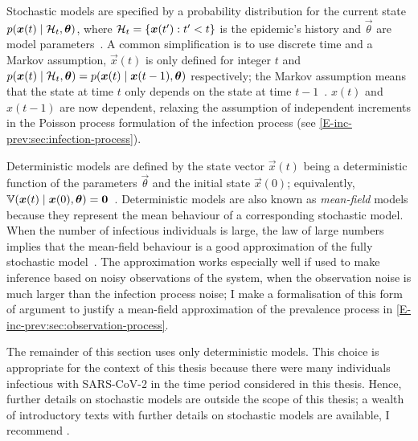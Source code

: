 \documentclass[thesis.tex]{subfiles}
\begin{document}
Stochastic models are specified by a probability distribution for the current state $p(\bm{x}(t) \mid \mathcal{H}_t, \bm{\theta})$, where $\mathcal{H}_t = \{ \bm{x}(t') : t' < t \}$ is the epidemic's history and $\vec{\theta}$ are model parameters~\autocite{birrellEvidence,dukicTracking,corbellaThesis,keelingModeling}.
A common simplification is to use discrete time and a Markov assumption, \ie $\vec{x}(t)$ is only defined for integer $t$ and $p(\bm{x}(t) \mid \mathcal{H}_t, \bm{\theta}) = p(\bm{x}(t) \mid \bm{x}(t-1), \bm{\theta})$ respectively; the Markov assumption means that the state at time $t$ only depends on the state at time $t-1$~\autocite{birrellEvidence}.
$x(t)$ and $x(t-1)$ are now dependent, relaxing the assumption of independent increments in the Poisson process formulation of the infection process (see \cref{E-inc-prev:sec:infection-process}).

Deterministic models are defined by the state vector $\vec{x}(t)$ being a deterministic function of the parameters $\vec{\theta}$ and the initial state $\vec{x}(0)$; equivalently, $\operatorname{\mathbb{V}}(\bm{x}(t) \mid \bm{x}(0), \bm{\theta}) = \bm{0}$~\autocite{birrellEvidence}.
Deterministic models are also known as \emph{mean-field} models because they represent the mean behaviour of a corresponding stochastic model.
When the number of infectious individuals is large, the law of large numbers implies that the mean-field behaviour is a good approximation of the fully stochastic model~\autocite[20]{diekmannMathematical}.
The approximation works especially well if used to make inference based on noisy observations of the system, when the observation noise is much larger than the infection process noise; I make a formalisation of this form of argument to justify a mean-field approximation of the prevalence process in \cref{E-inc-prev:sec:observation-process}.

The remainder of this section uses only deterministic models.
This choice is appropriate for the context of this thesis because there were many individuals infectious with SARS-CoV-2 in the time period considered in this thesis.
Hence, further details on stochastic models are outside the scope of this thesis; a wealth of introductory texts with further details on stochastic models are available, I recommend \textcite[chapter 6]{keelingModeling}.

\end{document}
